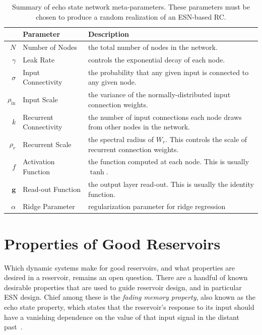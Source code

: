 \begin{table}
  \caption{Summary of echo state network meta-parameters. These
    parameters must be chosen to produce a random realization of an
    ESN-based RC.}
  \begin{tabularx}{\linewidth}{rlX}
    & Parameter & Description \\
    \hline
    \rule{0pt}{4ex}
    $N$ & Number of Nodes & the total number of nodes in the network. \\
    \rule{0pt}{4ex}
    $\gamma$ & Leak Rate & controls the exponential decay of each node. \\
    \rule{0pt}{4ex}
    $\sigma$ & Input Connectivity & the probability that any given input is connected to any given node. \\
    \rule{0pt}{4ex}
    $\rho_\text{in}$ & Input Scale & the variance of the normally-distributed input connection weights. \\
    \rule{0pt}{4ex}
    $k$ & Recurrent Connectivity & the number of input connections each node draws from other nodes in the network. \\
    \rule{0pt}{4ex}
    $\rho_r$ & Recurrent Scale & the spectral radius of $W_r$. This controls the scale of recurrent connection weights. \\
    \rule{0pt}{4ex}
    $f$ & Activation Function & the function computed at each node. This is usually $\tanh$. \\
    \rule{0pt}{4ex}
    $\bm{g}$ & Read-out Function & the output layer read-out. This is usually the identity function. \\
    \rule{0pt}{4ex}
    $\alpha$ & Ridge Parameter & regularization parameter for ridge regression \\
  \end{tabularx}
  \label{tab:esn-metaparameters}
\end{table}

\section{Properties of Good Reservoirs}\label{sec:reservoir-properties}

Which dynamic systems make for good reservoirs, and what properties
are desired in a reservoir, remains an open question. There are a
handful of known desirable properties that are used to guide reservoir
design, and in particular ESN design. Chief among these is the
\emph{fading memory property}, also known as the echo state property, which states that the reservoir's
response to its input should have a vanishing dependence on the value
of that input signal in the distant past~\cite{jaeger2001,jaeger2002}.

